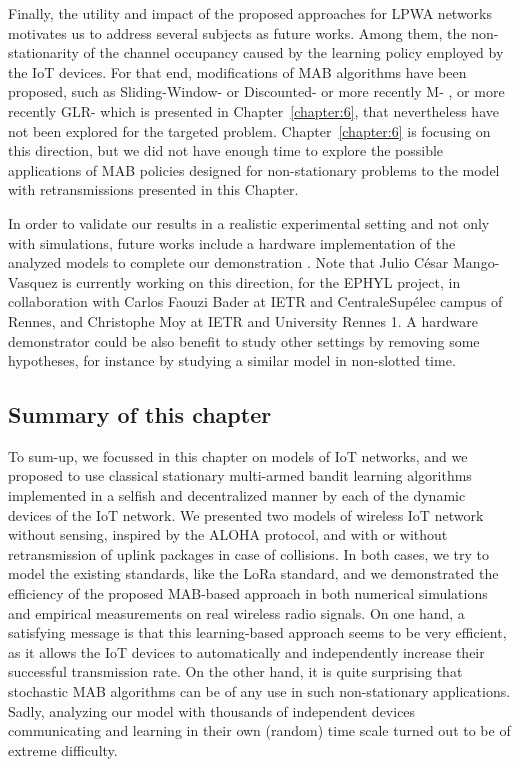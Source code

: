 Finally, the utility and impact of the proposed approaches for LPWA networks motivates us to address several subjects as future works. Among them, the non-stationarity of the channel occupancy caused by the learning policy employed by the IoT devices.
%
For that end, modifications of MAB algorithms have been proposed, such as Sliding-Window-\UCB{} or Discounted-\UCB{} \cite{Garivier11UCBDiscount}
or more recently M-\UCB{} \cite{CaoZhenKvetonXie18},
or more recently GLR-\UCB{} \cite{Besson2019GLRT} which is presented in Chapter~\ref{chapter:6},
that nevertheless have not been explored for the targeted problem.
Chapter~\ref{chapter:6} is focusing on this direction, but we did not have enough time to explore the possible applications of MAB policies designed for non-stationary problems to the model with retransmissions presented in this Chapter.

In order to validate our results in a realistic experimental setting and not only with simulations, future works include a hardware implementation of the analyzed models to complete our demonstration \cite{Besson2019WCNC}.
Note that Julio César Mango-Vasquez is currently working on this direction, for the EPHYL project, in collaboration with Carlos Faouzi Bader at IETR and CentraleSupélec campus of Rennes, and Christophe Moy at IETR and University Rennes 1.
%
A hardware demonstrator could be also benefit to study other settings by removing some hypotheses, for instance by studying a similar model in non-slotted time.


\subsection*{Summary of this chapter}

To sum-up, we focussed in this chapter on models of IoT networks, and we proposed to use classical stationary multi-armed bandit learning algorithms implemented in a selfish and decentralized manner by each of the dynamic devices of the IoT network.
We presented two models of wireless IoT network without sensing, inspired by the ALOHA protocol, and with or without retransmission of uplink packages in case of collisions.
In both cases, we try to model the existing standards, like the LoRa standard, and we demonstrated the efficiency of the proposed MAB-based approach in both numerical simulations and empirical measurements on real wireless radio signals.
%
On one hand, a satisfying message is that this learning-based approach seems to be very efficient, as it allows the IoT devices to automatically and independently increase their successful transmission rate.
On the other hand, it is quite surprising that stochastic MAB algorithms can be of any use in such non-stationary applications.
Sadly, analyzing our model with thousands of independent devices communicating and learning in their own (random) time scale turned out to be of extreme difficulty.




